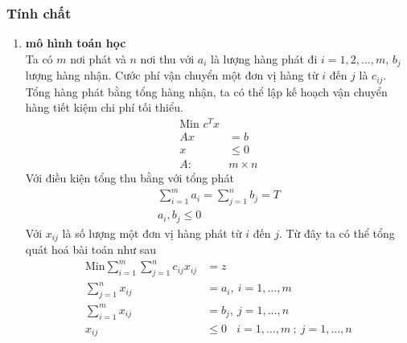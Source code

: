 \documentclass{article}
\begin{document}
        \subsubsection{Tính chất}
            \begin{enumerate}
                \item \textbf{mô hình toán học}\\
                Ta có $m$ nơi phát và $n$ nơi thu với $a_i$ là lượng hàng phát đi $i=1,2,\ldots,m$, $b_j$ lượng hàng nhận. Cước phí vận chuyển một đơn vị hàng từ $i$ đến $j$ là $c_{ij}$. Tổng hàng phát bằng tổng hàng nhận, ta có thể lập kế hoạch vận chuyển hàng tiết kiệm chi phí tối thiểu.
                    \begin{equation}
                        \begin{split}
                            \text{Min } c^Tx \\
                            Ax&=b \\
                            x& \le 0 \\
                            A : \: & m \times n
                        \end{split}
                    \end{equation}
        Với điều kiện tổng thu bằng với tổng phát
                    \begin{equation}
                        \begin{split}
                            \sum_{i=1}^m a_i = \sum_{j=1}^n b_j = T \\
                            a_i , b_j \le 0
                        \end{split}
                    \end{equation}
        Với $x_{ij}$ là số lượng một đơn vị hàng phát từ $i$ đến $j$. Từ đây ta có thể tổng quát hoá bài toán như sau
                    \begin{equation}
                        \begin{split} 
                            \text{Min} \sum_{i=1}^m \sum_{j=1}^n c_{ij} x_{ij} & = z \\
                            \sum_{j=1}^n x_{ij} &= a_i , \: i=1, \ldots ,m \\
                            \sum_{i=1}^m x_{ij} &= b_j , \: j=1, \ldots ,n \\
                            x_{ij} &\le 0 \:\:\:\: i=1,...,m \: ; \: j=1,...,n
                        \end{split}
                    \end{equation}

\end{enumerate}
\end{document}
